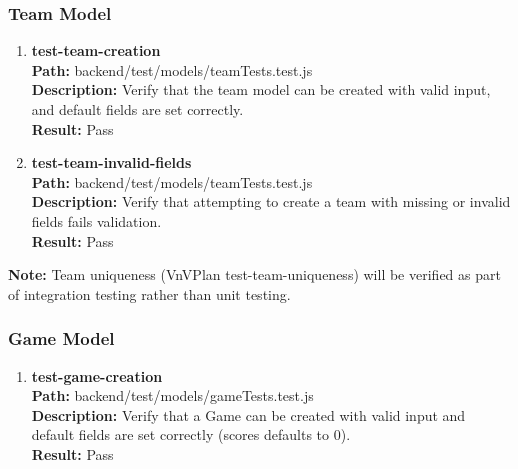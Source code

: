 \documentclass[12pt, titlepage]{article}
\begin{document}
\subsubsection{Team Model}
\begin{enumerate}
    \item{\textbf{test-team-creation}\\}
        \textbf{Path:} backend/test/models/teamTests.test.js\\
        \textbf{Description:} Verify that the team model can be created with valid input, and default fields are set correctly.\\
        \textbf{Result:} Pass

    \item{\textbf{test-team-invalid-fields}\\}
        \textbf{Path:} backend/test/models/teamTests.test.js\\
        \textbf{Description:} Verify that attempting to create a team with missing or invalid fields fails validation.\\
        \textbf{Result:} Pass
\end{enumerate}

\textbf{Note:} Team uniqueness (VnVPlan test-team-uniqueness) will be verified as part of integration testing rather than unit testing.
\subsubsection{Game Model}
\begin{enumerate}
    \item{\textbf{test-game-creation}\\}
        \textbf{Path:} backend/test/models/gameTests.test.js\\
        \textbf{Description:} Verify that a Game can be created with valid input and default fields are set correctly (scores defaults to 0).\\
        \textbf{Result:} Pass
\end{enumerate}
\end{document}
